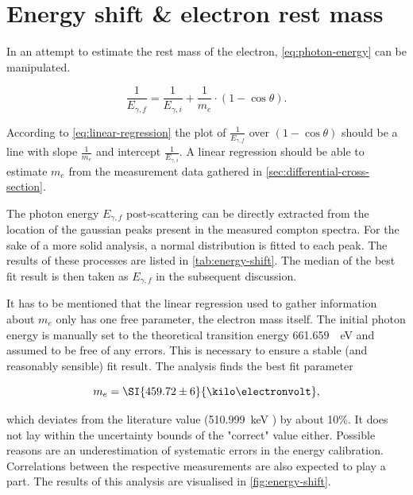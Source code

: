
\section{Energy shift \& electron rest mass}
\label{sec:energy-shift}

In an attempt to estimate the rest mass of the electron, \autoref{eq:photon-energy}
can be manipulated.

\begin{equation}
\label{eq:linear-regression}
\frac{1}{E_{\gamma,f}} = \frac{1}{E_{\gamma,i}} + \frac{1}{m_e}\cdot\left(1-\cos\theta\right).
\end{equation}

According to \autoref{eq:linear-regression} the plot of $\frac{1}{E_{\gamma,f}}$ over
$(1-\cos\theta)$ should be a line with slope $\frac{1}{m_e}$ and intercept 
$\frac{1}{E_{\gamma,i}}$. A linear regression should be able to estimate $m_e$ from
the measurement data gathered in \autoref{sec:differential-cross-section}.

The photon energy $E_{\gamma,f}$ post-scattering can be directly extracted from the 
location of the gaussian peaks present in the measured compton spectra. For the sake
of a more solid analysis, a normal distribution is fitted to each peak. The results
of these processes are listed in \autoref{tab:energy-shift}. The median of the best 
fit result is then taken as $E_{\gamma,f}$ in the subsequent discussion.



It has to be mentioned that the linear regression used to gather information about
$m_e$ only has one free parameter, the electron mass itself. The initial photon 
energy is manually set to the theoretical transition energy \SI{661.659}{\kilo
\electronvolt} and assumed to be free of any errors. This is necessary to ensure a 
stable (and reasonably  sensible) fit result. The analysis finds the best fit 
parameter

\begin{equation}
\label{eq:electron-mass-estimate}
	m_e = \SI{459.72 \pm 6}{\kilo\electronvolt},
\end{equation}

which deviates from the literature value (\SI{510.999}{\kilo\electronvolt}
\cite{patrignani2016review}) by about 10\%. It does not lay within the uncertainty
bounds of the "correct" value either. Possible reasons are an underestimation of 
systematic errors in the energy calibration. Correlations between the respective 
measurements are also expected to play a part. The results of this analysis are 
visualised in \autoref{fig:energy-shift}.

